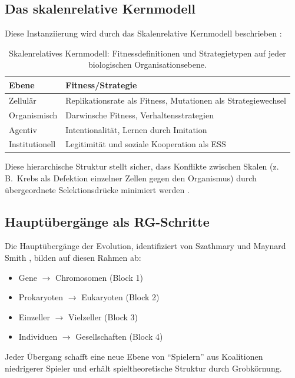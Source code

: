 \documentclass[12pt,a4paper]{article}
\theoremstyle{remark}
\begin{document}
\subsection{Das skalenrelative Kernmodell}

Diese Instanziierung wird durch das Skalenrelative Kernmodell beschrieben \citep{ReplicatorOptimization}:

\begin{table}[ht]
\centering
\caption{Skalenrelatives Kernmodell: Fitnessdefinitionen und Strategietypen auf jeder biologischen Organisationsebene.}
\label{tab:scale-kernel}
\begin{tabular}{ll}
\toprule
\textbf{Ebene} & \textbf{Fitness/Strategie} \\
\midrule
Zellul\"ar & Replikationsrate als Fitness, Mutationen als Strategiewechsel \\
Organismisch & Darwinsche Fitness, Verhaltensstrategien \\
Agentiv & Intentionalit\"at, Lernen durch Imitation \\
Institutionell & Legitimit\"at und soziale Kooperation als ESS \\
\bottomrule
\end{tabular}
\end{table}

Diese hierarchische Struktur stellt sicher, dass Konflikte zwischen Skalen (z.\,B.\ Krebs als Defektion einzelner Zellen gegen den Organismus) durch \"ubergeordnete Selektionsdr\"ucke minimiert werden \citep{ReplicatorOptimization}.

\subsection{Haupt\"uberg\"ange als RG-Schritte}

Die Haupt\"uberg\"ange der Evolution, identifiziert von Szathmary und Maynard Smith \citep{SzathmaryMaynardSmith1995}, bilden auf diesen Rahmen ab:

\begin{itemize}
    \item Gene $\to$ Chromosomen (Block 1)
    \item Prokaryoten $\to$ Eukaryoten (Block 2)
    \item Einzeller $\to$ Vielzeller (Block 3)
    \item Individuen $\to$ Gesellschaften (Block 4)
\end{itemize}

Jeder \"Ubergang schafft eine neue Ebene von ``Spielern'' aus Koalitionen niedrigerer Spieler und erh\"alt spieltheoretische Struktur durch Grobk\"ornung.
\end{document}
